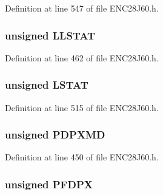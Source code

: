 Definition at line 547 of file E\+N\+C28\+J60.\+h.

\hypertarget{union_p_h_y_r_e_g_af87708a3a79878920e12bf308f26773a}{}
\subsubsection[{L\+L\+S\+T\+A\+T}]{\setlength{\rightskip}{0pt plus 5cm}unsigned L\+L\+S\+T\+A\+T}\label{union_p_h_y_r_e_g_af87708a3a79878920e12bf308f26773a}


Definition at line 462 of file E\+N\+C28\+J60.\+h.

\hypertarget{union_p_h_y_r_e_g_a97346fd35aac08deef041f3faca1954f}{}
\subsubsection[{L\+S\+T\+A\+T}]{\setlength{\rightskip}{0pt plus 5cm}unsigned L\+S\+T\+A\+T}\label{union_p_h_y_r_e_g_a97346fd35aac08deef041f3faca1954f}


Definition at line 515 of file E\+N\+C28\+J60.\+h.

\hypertarget{union_p_h_y_r_e_g_a2e0978ce52433ab2192b913a8aea44ff}{}
\subsubsection[{P\+D\+P\+X\+M\+D}]{\setlength{\rightskip}{0pt plus 5cm}unsigned P\+D\+P\+X\+M\+D}\label{union_p_h_y_r_e_g_a2e0978ce52433ab2192b913a8aea44ff}


Definition at line 450 of file E\+N\+C28\+J60.\+h.

\hypertarget{union_p_h_y_r_e_g_add8043188d4528c3d4fdbe8b5245e039}{}
\subsubsection[{P\+F\+D\+P\+X}]{\setlength{\rightskip}{0pt plus 5cm}unsigned P\+F\+D\+P\+X}\label{union_p_h_y_r_e_g_add8043188d4528c3d4fdbe8b5245e039}


